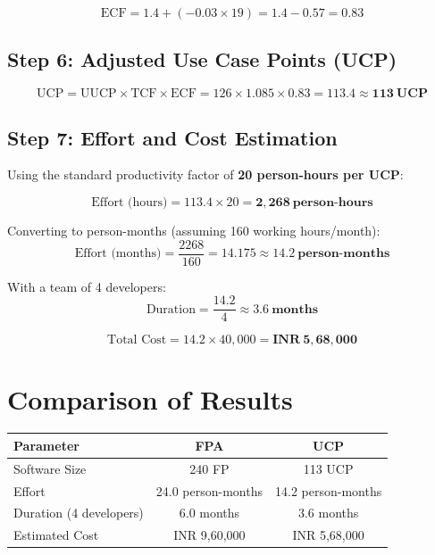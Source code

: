 \documentclass[12pt,a4paper]{article}
\begin{document}
\[
\text{ECF} = 1.4 + (-0.03 \times 19) = 1.4 - 0.57 = \mathbf{0.83}
\]

\subsection{Step 6: Adjusted Use Case Points (UCP)}

\[
\text{UCP} = \text{UUCP} \times \text{TCF} \times \text{ECF} = 126 \times 1.085 \times 0.83 = \mathbf{113.4 \approx 113~UCP}
\]

\subsection{Step 7: Effort and Cost Estimation}

Using the standard productivity factor of \textbf{20 person-hours per UCP}:

\[
\text{Effort (hours)} = 113.4 \times 20 = \mathbf{2{,}268~\text{person-hours}}
\]

\noindent Converting to person-months (assuming 160 working hours/month):
\[
\text{Effort (months)} = \frac{2268}{160} = \mathbf{14.175 \approx 14.2~\text{person-months}}
\]

With a team of 4 developers:
\[
\text{Duration} = \frac{14.2}{4} \approx \mathbf{3.6~\text{months}}
\]

\[
\text{Total Cost} = 14.2 \times 40{,}000 = \mathbf{\textrm{INR}~5,68,000}
\]

\section{Comparison of Results}

\begin{center}
\begin{tabular}{lcc}
\toprule
\textbf{Parameter} & \textbf{FPA} & \textbf{UCP} \\
\midrule
Software Size & 240 FP & 113 UCP \\
Effort & 24.0 person-months & 14.2 person-months \\
Duration (4 developers) & 6.0 months & 3.6 months \\
Estimated Cost & INR 9,60,000 & INR 5,68,000 \\
\bottomrule
\end{tabular}
\end{center}
\end{document}
